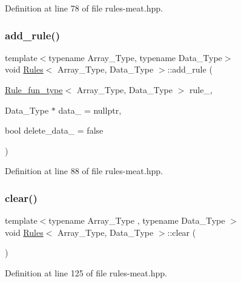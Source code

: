 Definition at line 78 of file rules-\/meat.\+hpp.

\mbox{\label{class_rules_abbc63747014445b538384bb500464bb5}} 
\subsubsection{\texorpdfstring{add\+\_\+rule()}{add\_rule()}\hspace{0.1cm}{\footnotesize\ttfamily [3/3]}}
{\footnotesize\ttfamily template$<$typename Array\+\_\+\+Type, typename Data\+\_\+\+Type$>$ \\
void \hyperlink{class_rules}{Rules}$<$ Array\+\_\+\+Type, Data\+\_\+\+Type $>$\+::add\+\_\+rule (\begin{DoxyParamCaption}\item[{\hyperlink{typedefs_8hpp_a2e147c9c0e8b65be614c98a5dd400d5c}{Rule\+\_\+fun\+\_\+type}$<$ Array\+\_\+\+Type, Data\+\_\+\+Type $>$}]{rule\+\_\+,  }\item[{Data\+\_\+\+Type $\ast$}]{data\+\_\+ = {\ttfamily nullptr},  }\item[{bool}]{delete\+\_\+data\+\_\+ = {\ttfamily false} }\end{DoxyParamCaption})\hspace{0.3cm}{\ttfamily [inline]}}



Definition at line 88 of file rules-\/meat.\+hpp.

\mbox{\label{class_rules_a135a15d3ff70d4350d76a15f8e85f7df}} 
\subsubsection{\texorpdfstring{clear()}{clear()}}
{\footnotesize\ttfamily template$<$typename Array\+\_\+\+Type , typename Data\+\_\+\+Type $>$ \\
void \hyperlink{class_rules}{Rules}$<$ Array\+\_\+\+Type, Data\+\_\+\+Type $>$\+::clear (\begin{DoxyParamCaption}{ }\end{DoxyParamCaption})\hspace{0.3cm}{\ttfamily [inline]}}



Definition at line 125 of file rules-\/meat.\+hpp.

